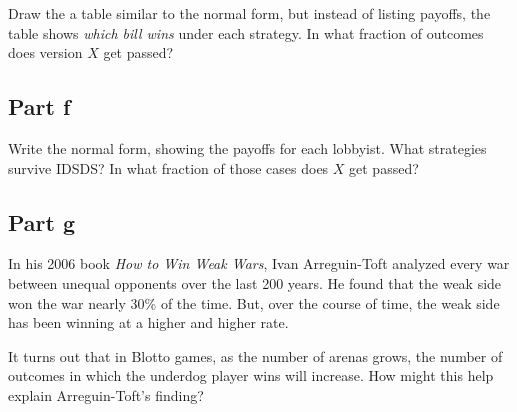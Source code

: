 \documentclass[10pt]{article}
\begin{document}
Draw the a table similar to the normal form, but instead of listing payoffs, the table shows \emph{which bill wins} under each strategy. In what fraction of outcomes does version $X$ get passed?

\newpage

\subsection*{Part f} Write the normal form, showing the payoffs for each lobbyist. What strategies survive IDSDS? In what fraction of those cases does $X$ get passed?

\newpage

\subsection*{Part g} In his 2006 book \emph{How to Win Weak Wars}, Ivan Arreguin-Toft analyzed every war between unequal opponents over the last 200 years. He found that the weak side won the war nearly 30\% of the time. But, over the course of time, the weak side has been winning at a higher and higher rate.

It turns out that in Blotto games, as the number of arenas grows, the number of outcomes in which the underdog player wins will increase. How might this help explain Arreguin-Toft's finding?
\end{document}
